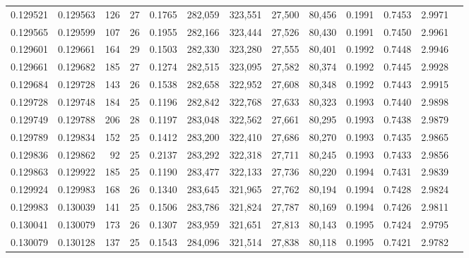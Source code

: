\begin{tabular}{rrrrrrrrrrrrr}
0.129521 & 0.129563 & 126 &  27 &                                     0.1765 & 282,059 & 323,551 &  27,500 &  80,456 & 0.1991 & 0.7453 & 2.9971 \\
0.129565 & 0.129599 & 107 &  26 &                                     0.1955 & 282,166 & 323,444 &  27,526 &  80,430 & 0.1991 & 0.7450 & 2.9961 \\
0.129601 & 0.129661 & 164 &  29 &                                     0.1503 & 282,330 & 323,280 &  27,555 &  80,401 & 0.1992 & 0.7448 & 2.9946 \\
0.129661 & 0.129682 & 185 &  27 &                                     0.1274 & 282,515 & 323,095 &  27,582 &  80,374 & 0.1992 & 0.7445 & 2.9928 \\
0.129684 & 0.129728 & 143 &  26 &                                     0.1538 & 282,658 & 322,952 &  27,608 &  80,348 & 0.1992 & 0.7443 & 2.9915 \\
0.129728 & 0.129748 & 184 &  25 &                                     0.1196 & 282,842 & 322,768 &  27,633 &  80,323 & 0.1993 & 0.7440 & 2.9898 \\
0.129749 & 0.129788 & 206 &  28 &                                     0.1197 & 283,048 & 322,562 &  27,661 &  80,295 & 0.1993 & 0.7438 & 2.9879 \\
0.129789 & 0.129834 & 152 &  25 &                                     0.1412 & 283,200 & 322,410 &  27,686 &  80,270 & 0.1993 & 0.7435 & 2.9865 \\
0.129836 & 0.129862 &  92 &  25 &                                     0.2137 & 283,292 & 322,318 &  27,711 &  80,245 & 0.1993 & 0.7433 & 2.9856 \\
0.129863 & 0.129922 & 185 &  25 &                                     0.1190 & 283,477 & 322,133 &  27,736 &  80,220 & 0.1994 & 0.7431 & 2.9839 \\
0.129924 & 0.129983 & 168 &  26 &                                     0.1340 & 283,645 & 321,965 &  27,762 &  80,194 & 0.1994 & 0.7428 & 2.9824 \\
0.129983 & 0.130039 & 141 &  25 &                                     0.1506 & 283,786 & 321,824 &  27,787 &  80,169 & 0.1994 & 0.7426 & 2.9811 \\
0.130041 & 0.130079 & 173 &  26 &                                     0.1307 & 283,959 & 321,651 &  27,813 &  80,143 & 0.1995 & 0.7424 & 2.9795 \\
0.130079 & 0.130128 & 137 &  25 &                                     0.1543 & 284,096 & 321,514 &  27,838 &  80,118 & 0.1995 & 0.7421 & 2.9782 \\

\end{tabular}
